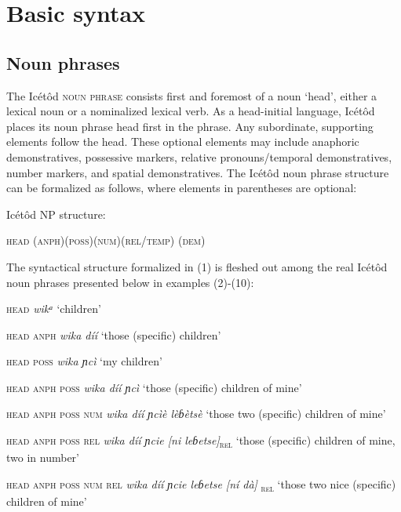 \begin{table}
\section{Basic syntax}



\subsection{Noun phrases}


The Icétôd \textsc{noun phrase} consists first and foremost of a noun ‘head’, either a lexical noun or a nominalized lexical verb. As a head-initial language, Icétôd places its noun phrase head first in the phrase. Any subordinate, supporting elements follow the head. These optional elements may include anaphoric demonstratives, possessive markers, relative pronouns/temporal demonstratives, number markers, and spatial demonstratives. The Icétôd noun phrase structure can be formalized as follows, where elements in parentheses are optional:




Icétôd NP structure: 

\textsc{head (anph)(poss)(num)(rel/temp) (dem)}


The syntactical structure formalized in (1) is fleshed out among the real Icétôd noun phrases presented below in examples (2)-(10):



\textsc{head}
\textit{wikᵃ}
‘children’




\textsc{head anph}
\textit{wika díí}
‘those (specific) children’




\textsc{head poss}
\textit{wika ɲcì}
‘my children’




\textsc{head anph poss}
\textit{wika díí ɲcì}
‘those (specific) children of mine’




\textsc{head anph poss num}
\textit{wika díí ɲcìè lèɓètsè}
‘those two (specific) children of mine’




\textsc{head anph poss rel}
\textit{wika díí ɲcie [ni leɓetse]}\textsc{\textsubscript{rel }}
‘those (specific) children of mine, two in number’




\textsc{head anph poss num rel}
\textit{wika díí ɲcie leɓetse [ní dà]}\textsc{\textsubscript{ rel}}
‘those two nice (specific) children of mine’





\end{table}
